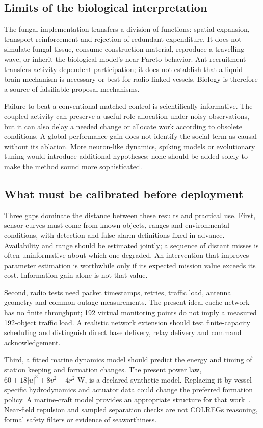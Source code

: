 \subsection{Limits of the biological interpretation}
The fungal implementation transfers a division of functions: spatial expansion,
transport reinforcement and rejection of redundant expenditure. It does not
simulate fungal tissue, consume construction material, reproduce a travelling
wave, or inherit the biological model's near-Pareto behavior. Ant recruitment
transfers activity-dependent participation; it does not establish that a
liquid-brain mechanism is necessary or best for radio-linked vessels.
Biology is therefore a source of falsifiable proposal mechanisms.

Failure to beat a conventional matched control is scientifically informative.
The coupled activity can preserve a useful role allocation under noisy
observations, but it can also delay a needed change or allocate work according
to obsolete conditions. A global performance gain does not identify the
social term as causal without its ablation. More neuron-like dynamics,
spiking models or evolutionary tuning would introduce additional hypotheses;
none should be added solely to make the method sound more sophisticated.

\subsection{What must be calibrated before deployment}
Three gaps dominate the distance between these results and practical use.
First, sensor curves must come from known objects, ranges and environmental
conditions, with detection and false-alarm definitions fixed in advance.
Availability and range should be estimated jointly; a sequence of distant
misses is often uninformative about which one degraded. An intervention that
improves parameter estimation is worthwhile only if its expected mission value
exceeds its cost. Information gain alone is not that value.

Second, radio tests need packet timestamps, retries, traffic load, antenna
geometry and common-outage measurements. The present ideal cache network has
no finite throughput; 192 virtual monitoring points do not imply a measured
192-object traffic load. A realistic network extension should test
finite-capacity scheduling and distinguish direct base delivery, relay
delivery and command acknowledgement.

Third, a fitted marine dynamics model should predict the energy and timing of
station keeping and formation changes. The present power law,
$60+18|u|^3+8v^2+4r^2$ W, is a declared synthetic model.
Replacing it by vessel-specific hydrodynamics and actuator data could change
the preferred formation policy. A marine-craft model provides an appropriate
structure for that work~\cite{fossen2021}.
Near-field repulsion and sampled separation checks are not COLREGs reasoning,
formal safety filters or evidence of seaworthiness.

